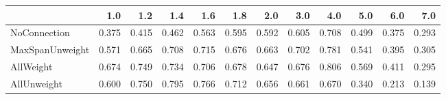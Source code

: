 \begin{tabular}{lrrrrrrrrrrr}
\toprule
{} &   1.0 &   1.2 &   1.4 &   1.6 &   1.8 &   2.0 &   3.0 &   4.0 &   5.0 &   6.0 &   7.0 \\
\midrule
NoConnection    & 0.375 & 0.415 & 0.462 & 0.563 & 0.595 & 0.592 & 0.605 & 0.708 & 0.499 & 0.375 & 0.293 \\
MaxSpanUnweight & 0.571 & 0.665 & 0.708 & 0.715 & 0.676 & 0.663 & 0.702 & 0.781 & 0.541 & 0.395 & 0.305 \\
AllWeight       & 0.674 & 0.749 & 0.734 & 0.706 & 0.678 & 0.647 & 0.676 & 0.806 & 0.569 & 0.411 & 0.295 \\
AllUnweight     & 0.600 & 0.750 & 0.795 & 0.766 & 0.712 & 0.656 & 0.661 & 0.670 & 0.340 & 0.213 & 0.139 \\
\bottomrule
\end{tabular}
